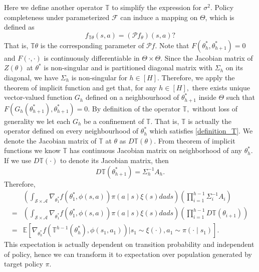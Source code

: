 \documentclass{article}
\numberwithin{equation}{section}
\theoremstyle{plain}
\theoremstyle{definition}
\theoremstyle{remark}
\begin{document}
Here we define another operator $\mathbb{T}$ to simplify the expression for $\sigma^2.$ Policy completeness under parameterized $\mathcal{F}$ can induce a mapping on $\Theta$, which is defined as
\begin{equation}\label{definition_T}
f_{\mathbb{T} \theta}(s, a)=\left(\mathcal{P} f_{\theta}\right)(s, a) ?
\end{equation}
That is, $\mathbb{T} \theta$ is the corresponding parameter of $\mathcal{P} f$. Note that $F(\theta_h^*,\theta_{h+1}^*) = 0$ and $F(\cdot,\cdot)$ is continuously differentiable in $\Theta \times \Theta.$ Since the Jacobian matrix of $Z(\theta)$ at $\theta^*$ is non-singular and is partitioned diagonal matrix with $\Sigma_h$ on its diagonal, we have $\Sigma_h$ is non-singular for $h \in [H].$ Therefore, we apply the theorem of implicit function and get that, for any $h \in [H],$ there exists unique vector-valued function $G_h$ defined on a neighbourhood of $\theta_{h+1}^*$ inside $\Theta$ such that $F(G_h(\theta_{h+1}^*),\theta_{h+1}^*) = 0.$ By definition of the operator $\mathbb{T},$ without loss of generality we let each $G_h$ be a confinement of $\mathbb{T}.$ That is, $\mathbb{T}$ is actually the operator defined on every neighbourhood of $\theta^*_h$ which satisfies \eqref{definition_T}. We denote the Jacobian matrix of $\mathbb{T}$ at $\theta$ as $D\mathbb{T}(\theta).$ From theorem of implicit functions we know $\mathbb{T}$ has continuous Jacobian matrix on neighborhood of any $\theta_h^*.$ If we use $D\mathbb{T}(\cdot)$ to denote its Jacobian matrix, then
\begin{equation*}
    D\mathbb{T}(\theta_{h+1}^*) = \Sigma_h^{-1} A_h.
\end{equation*}
Therefore,
\begin{align*}
    &\left(\int_{\mathcal{S} \times \mathcal{A}} \nabla_{\theta_1^*} f(\theta_1^*,\phi(s,a)) \pi(a \mid s) \xi(s) d a d s\right) \left(\prod_{i=1}^{h-1} \Sigma_i^{-1} A_i \right)\\
    = & \left(\int_{\mathcal{S} \times \mathcal{A}} \nabla_{\theta_1^*} f(\theta_1^*,\phi(s,a)) \pi(a \mid s) \xi(s) d a d s\right) \left(\prod_{i=1}^{h-1} D\mathbb{T}(\theta_{i+1})\right) \\
    = & \mathbb{E}\left[\nabla_{\theta_h^*} f\left(\mathbb{T}^{h-1}\left(\theta_{h}^*\right), \phi(s_1, a_1)\right) \bigg| s_1 \sim \xi(\cdot), a_1 \sim \pi(\cdot \mid s_1)\right].
\end{align*}
This expectation is actually dependent on transition probability and independent of policy, hence we can transform it to expectation over population generated by target policy $\pi.$
\end{document}
